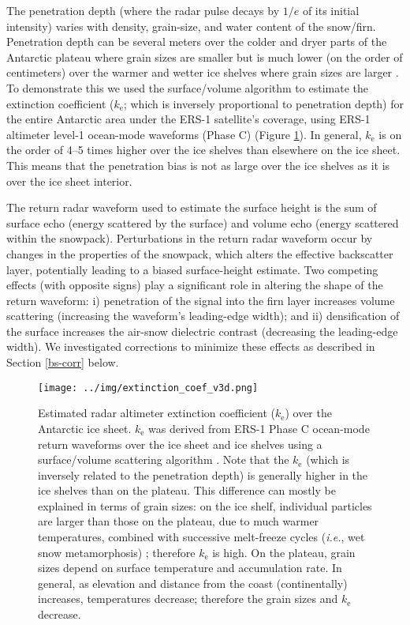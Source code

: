 The penetration depth (where the radar pulse decays by $1/e$ of its initial intensity) varies with density, grain-size, and water content of the snow/firn. Penetration depth can be several meters over the colder and dryer parts of the Antarctic plateau where grain sizes are smaller but is much lower (on the order of centimeters) over the warmer and wetter ice shelves where grain sizes are larger \parencite{Davis1996}. To demonstrate this we used the \parencite{Davis1993} surface/volume algorithm to estimate the extinction coefficient ($k_\text{e}$; which is inversely proportional to penetration depth) for the entire Antarctic area under the ERS-1 satellite's coverage, using ERS-1 altimeter level-1 ocean-mode waveforms (Phase C) (Figure \ref{c2f4}). In general, $k_\text{e}$ is on the order of 4--5 times higher over the ice shelves than elsewhere on the ice sheet. This means that the penetration bias is not as large over the ice shelves as it is over the ice sheet interior.

The return radar waveform used to estimate the surface height is the sum of surface echo (energy scattered by the surface) and volume echo (energy scattered within the snowpack). Perturbations in the return radar waveform occur by changes in the properties of the snowpack, which alters the effective backscatter layer, potentially leading to a biased surface-height estimate. Two competing effects (with opposite signs) play a significant role in altering the shape of the return waveform: i) penetration of the signal into the firn layer increases volume scattering (increasing the waveform’s leading-edge width); and ii) densification of the surface increases the air-snow dielectric contrast (decreasing the leading-edge width). We investigated corrections to minimize these effects as described in Section \ref{bs-corr} below.


\begin{figure}[!ht]
  \texttt{[image: ../img/extinction\_coef\_v3d.png]}
  \caption{
  Estimated radar altimeter extinction coefficient ($k_\text{e}$) over the Antarctic ice sheet. $k_\text{e}$ was derived from ERS-1 Phase C ocean-mode return waveforms over the ice sheet and ice shelves using a surface/volume scattering algorithm \parencite{Davis1993}. Note that the $k_\text{e}$  (which is inversely related to the penetration depth) is generally higher in the ice shelves than on the plateau. This difference can mostly be explained in terms of grain sizes: on the ice shelf, individual particles are larger than those on the plateau, due to much warmer temperatures, combined with successive melt-freeze cycles ({\it i.e.}, wet snow metamorphosis) \parencite{Zwally1994}; therefore $k_\text{e}$ is high. On the plateau, grain sizes depend on surface temperature and accumulation rate. In general, as elevation and distance from the coast (continentally) increases, temperatures decrease; therefore the grain sizes and $k_\text{e}$ decrease.
  }
  \label{c2f4}
\end{figure}


